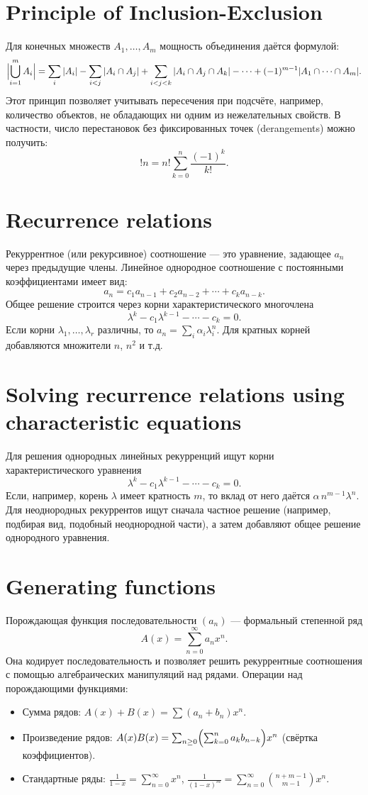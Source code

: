 \documentclass{article}
\begin{document}
	\section{Principle of Inclusion-Exclusion}
	Для конечных множеств $A_1,\dots,A_m$ мощность объединения даётся формулой:
	\[
	\Bigl|\bigcup_{i=1}^m A_i\Bigr| = \sum_{i}|A_i| - \sum_{i<j}|A_i\cap A_j| + \sum_{i<j<k}|A_i\cap A_j\cap A_k| - \cdots + (-1)^{m-1}|A_1\cap \cdots \cap A_m|.
	\]
	Этот принцип позволяет учитывать пересечения при подсчёте, например, количество объектов, не обладающих ни одним из нежелательных свойств. В частности, число перестановок без фиксированных точек (derangements) можно получить:
	\[
	!n = n!\sum_{k=0}^n \frac{(-1)^k}{k!}.
	\]
	
	\section{Recurrence relations}
	Рекуррентное (или рекурсивное) соотношение --- это уравнение, задающее $a_n$ через предыдущие члены. Линейное однородное соотношение с постоянными коэффициентами имеет вид:
	\[
	a_n = c_1 a_{n-1} + c_2 a_{n-2} + \cdots + c_k a_{n-k}.
	\]
	Общее решение строится через корни характеристического многочлена
	\[
	\lambda^k - c_1 \lambda^{k-1} - \cdots - c_k = 0.
	\]
	Если корни $\lambda_1,\dots,\lambda_r$ различны, то $a_n = \sum_i \alpha_i \lambda_i^n$. Для кратных корней добавляются множители $n$, $n^2$ и т.д.
	
	\section{Solving recurrence relations using characteristic equations}
	Для решения однородных линейных рекурренций ищут корни характеристического уравнения 
	\[
	\lambda^k - c_1 \lambda^{k-1} - \cdots - c_k = 0.
	\]
	Если, например, корень $\lambda$ имеет кратность $m$, то вклад от него даётся $\alpha\,n^{m-1}\lambda^n$. Для неоднородных рекуррентов ищут сначала частное решение (например, подбирая вид, подобный неоднородной части), а затем добавляют общее решение однородного уравнения.
	
	\section{Generating functions}
	Порождающая функция последовательности $(a_n)$ --- формальный степенной ряд
	\[
	A(x) = \sum_{n=0}^\infty a_n x^n.
	\]
	Она кодирует последовательность и позволяет решить рекуррентные соотношения с помощью алгебраических манипуляций над рядами. Операции над порождающими функциями:
	\begin{itemize}
		\item Сумма рядов: $A(x)+B(x)=\sum (a_n+b_n)x^n$.
		\item Произведение рядов: $A(x)B(x)=\sum_{n\ge0}\Bigl(\sum_{k=0}^n a_k b_{n-k}\Bigr)x^n$ (свёртка коэффициентов).
		\item Стандартные ряды: $\frac{1}{1-x}=\sum_{n=0}^\infty x^n$, \;$\frac{1}{(1-x)^m}=\sum_{n=0}^\infty \binom{n+m-1}{m-1}x^n$.
	\end{itemize}
	
\end{document}
